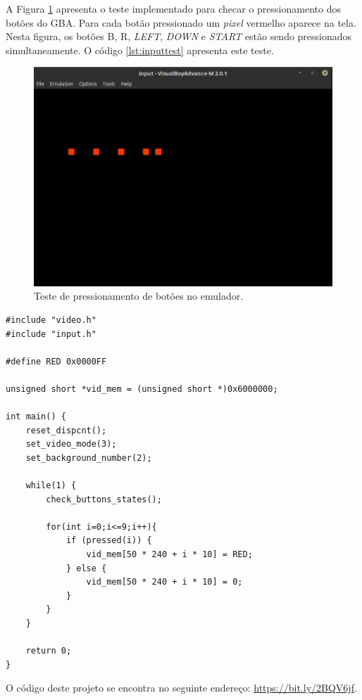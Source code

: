 A Figura \ref{demo-input} apresenta o teste implementado para checar o pressionamento dos botões do GBA. Para cada botão pressionado um \textit{pixel} vermelho aparece na tela. Nesta figura, os botões B, R, \textit{LEFT}, \textit{DOWN} e \textit{START} estão sendo pressionados simultaneamente. O código \ref{lst:inputtest} apresenta este teste.

\begin{figure}[H]
 \centering \includegraphics[keepaspectratio=true,scale=0.6]{figuras/demo-input.eps}
   \caption[Demonstração do pressionamento de botões no emulador]
    {Teste de pressionamento de botões no emulador.}
   \label{demo-input}
\end{figure}

\begin{lstlisting}[float,caption={Código de teste de \textit{input}.},label={lst:inputtest}]
#include "video.h"
#include "input.h"

#define RED 0x0000FF

unsigned short *vid_mem = (unsigned short *)0x6000000;

int main() {
    reset_dispcnt();
    set_video_mode(3);
    set_background_number(2);

    while(1) {
        check_buttons_states();

        for(int i=0;i<=9;i++){
            if (pressed(i)) {
                vid_mem[50 * 240 + i * 10] = RED;
            } else {
                vid_mem[50 * 240 + i * 10] = 0;
            }
        }
    }

    return 0;
}
\end{lstlisting}

O código deste projeto se encontra no seguinte endereço: \url{https://bit.ly/2BQV6jf}.